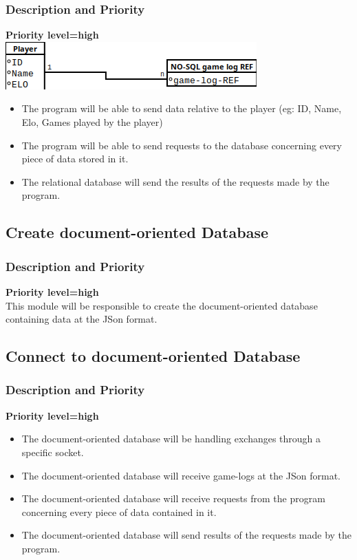 \documentclass{scrreprt}
\begin{document}
\subsubsection{Description and Priority}
\textbf{Priority level=high}\\
\includegraphics[keepaspectratio]{SQL}
\begin{itemize}
\item The program will be able to send data relative to the player (eg: ID, Name, Elo, Games played by the player)
\item The program will be able to send requests to the database concerning every piece of data stored in it.
\item The relational database will send the results of the requests made by the program.
\end{itemize}


\subsection{Create document-oriented Database}

\subsubsection{Description and Priority}
\textbf{Priority level=high}\\
This module will be responsible to create the document-oriented database containing data at the JSon format.

\subsection{Connect to document-oriented Database}
\subsubsection{Description and Priority}
\textbf{Priority level=high}\\
\begin{itemize}
\item The document-oriented database will be handling exchanges through a specific socket.
\item The document-oriented database will receive game-logs at the JSon format.
\item The document-oriented database will receive requests from the program concerning every piece of data contained in it.
\item The document-oriented database will send results of the requests made by the program.
\end{itemize}
\end{document}
